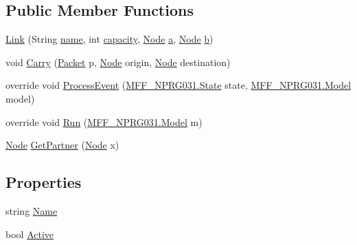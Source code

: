 \subsection*{Public Member Functions}
\begin{DoxyCompactItemize}
\item 
\hyperlink{classNetTrafficSimulator_1_1Link_a83847c253f988b59e7224d665901449b}{Link} (String \hyperlink{classNetTrafficSimulator_1_1Link_af5a2835b585c255fbc6584f2f5388be8}{name}, int \hyperlink{classNetTrafficSimulator_1_1Link_a24a004105c985c4e5ee64e4c839b1915}{capacity}, \hyperlink{classNetTrafficSimulator_1_1Node}{Node} \hyperlink{classNetTrafficSimulator_1_1Link_a4b7875d945423d1f64c31d8156a3308d}{a}, \hyperlink{classNetTrafficSimulator_1_1Node}{Node} \hyperlink{classNetTrafficSimulator_1_1Link_af85461b8b8d35adb1d8fc80849c0717d}{b})
\item 
void \hyperlink{classNetTrafficSimulator_1_1Link_a51bfc5e94e05941d8302c5552e36f1a3}{Carry} (\hyperlink{classNetTrafficSimulator_1_1Packet}{Packet} p, \hyperlink{classNetTrafficSimulator_1_1Node}{Node} origin, \hyperlink{classNetTrafficSimulator_1_1Node}{Node} destination)
\item 
override void \hyperlink{classNetTrafficSimulator_1_1Link_a953900c6d1064af45c99b9533eadeafe}{Process\-Event} (\hyperlink{classMFF__NPRG031_1_1State}{M\-F\-F\-\_\-\-N\-P\-R\-G031.\-State} state, \hyperlink{classMFF__NPRG031_1_1Model}{M\-F\-F\-\_\-\-N\-P\-R\-G031.\-Model} model)
\item 
override void \hyperlink{classNetTrafficSimulator_1_1Link_a654d0221ce7490d08ad40a70887b80c8}{Run} (\hyperlink{classMFF__NPRG031_1_1Model}{M\-F\-F\-\_\-\-N\-P\-R\-G031.\-Model} m)
\item 
\hyperlink{classNetTrafficSimulator_1_1Node}{Node} \hyperlink{classNetTrafficSimulator_1_1Link_a45cd71692f0fc8b76d4ae5f53d14580a}{Get\-Partner} (\hyperlink{classNetTrafficSimulator_1_1Node}{Node} x)
\end{DoxyCompactItemize}
\subsection*{Properties}
\begin{DoxyCompactItemize}
\item 
string \hyperlink{classNetTrafficSimulator_1_1Link_ac6510bbaac975c237d4dab9b492b5cfe}{Name}
\item 
bool \hyperlink{classNetTrafficSimulator_1_1Link_af5dbc33cd8e78697ce401ad2520877e8}{Active}
\end{DoxyCompactItemize}
